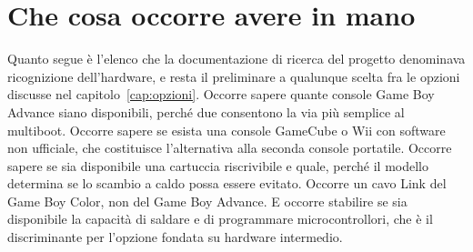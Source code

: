 \section{Che cosa occorre avere in mano}

Quanto segue è l'elenco che la documentazione di ricerca del progetto denominava ricognizione dell'hardware, e resta il preliminare a qualunque scelta fra le opzioni discusse nel capitolo~\ref{cap:opzioni}. Occorre sapere quante console Game Boy Advance siano disponibili, perché due consentono la via più semplice al multiboot. Occorre sapere se esista una console GameCube o Wii con software non ufficiale, che costituisce l'alternativa alla seconda console portatile. Occorre sapere se sia disponibile una cartuccia riscrivibile e quale, perché il modello determina se lo scambio a caldo possa essere evitato. Occorre un cavo Link del Game Boy Color, non del Game Boy Advance. E occorre stabilire se sia disponibile la capacità di saldare e di programmare microcontrollori, che è il discriminante per l'opzione fondata su hardware intermedio.
